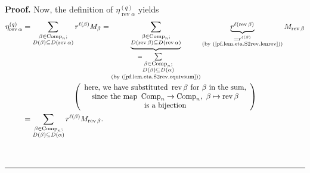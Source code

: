 \documentclass[numbers=enddot,12pt,final,onecolumn,notitlepage]{scrartcl}%
\theoremstyle{definition}
\newenvironment{proof}[1][Proof]{\noindent\textbf{#1.} }{\ \rule{0.5em}{0.5em}}
\let\sumnonlimits\sum
\renewcommand{\sum}{\sumnonlimits\limits}
\newenvironment{verlong}{}{}
\begin{document}
\begin{verlong}
\begin{proof}
Now, the definition of $\eta_{\operatorname*{rev}\alpha}^{\left(  q\right)  }$
yields%
\begin{align*}
\eta_{\operatorname*{rev}\alpha}^{\left(  q\right)  }  &  =\sum
_{\substack{\beta\in\operatorname*{Comp}\nolimits_{n};\\D\left(  \beta\right)
\subseteq D\left(  \operatorname*{rev}\alpha\right)  }}r^{\ell\left(
\beta\right)  }M_{\beta}=\underbrace{\sum_{\substack{\beta\in
\operatorname*{Comp}\nolimits_{n};\\D\left(  \operatorname*{rev}\beta\right)
\subseteq D\left(  \operatorname*{rev}\alpha\right)  }}}_{\substack{=\sum
_{\substack{\beta\in\operatorname*{Comp}\nolimits_{n};\\D\left(  \beta\right)
\subseteq D\left(  \alpha\right)  }}\\\text{(by
(\ref{pf.lem.eta.S2rev.equivsum}))}}}\underbrace{r^{\ell\left(
\operatorname*{rev}\beta\right)  }}_{\substack{=r^{\ell\left(  \beta\right)
}\\\text{(by (\ref{pf.lem.eta.S2rev.lenrev}))}}}M_{\operatorname*{rev}\beta}\\
&  \ \ \ \ \ \ \ \ \ \ \ \ \ \ \ \ \ \ \ \ \left(
\begin{array}
[c]{c}%
\text{here, we have substituted }\operatorname*{rev}\beta\text{ for }%
\beta\text{ in the sum,}\\
\text{since the map }\operatorname*{Comp}\nolimits_{n}\rightarrow
\operatorname*{Comp}\nolimits_{n},\ \beta\mapsto\operatorname*{rev}\beta\\
\text{is a bijection}%
\end{array}
\right) \\
&  =\sum_{\substack{\beta\in\operatorname*{Comp}\nolimits_{n};\\D\left(
\beta\right)  \subseteq D\left(  \alpha\right)  }}r^{\ell\left(  \beta\right)
}M_{\operatorname*{rev}\beta}.
\end{align*}



\end{proof}
\end{verlong}
\end{document}

